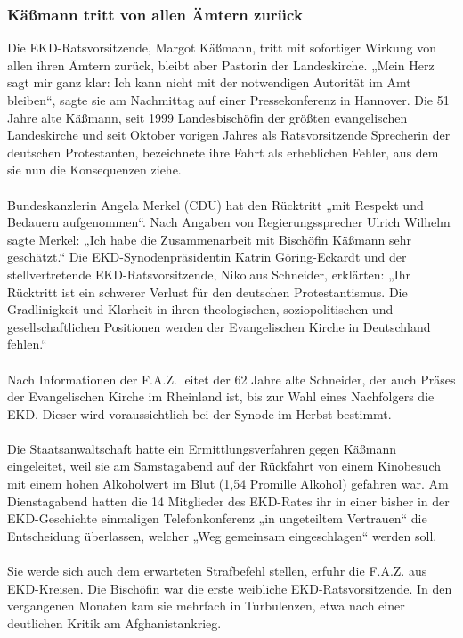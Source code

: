 \documentclass[a4paper,12pt,oneside]{scrbook}
\begin{document}
\subsubsection{Käßmann tritt von allen Ämtern zurück}
Die EKD-Ratsvorsitzende, Margot Käßmann, tritt mit sofortiger Wirkung von allen ihren Ämtern zurück, bleibt aber Pastorin der Landeskirche. „Mein Herz sagt mir ganz klar: Ich kann nicht mit der notwendigen Autorität im Amt bleiben“, sagte sie am Nachmittag auf einer Pressekonferenz in Hannover. Die 51 Jahre alte Käßmann, seit 1999 Landesbischöfin der größten evangelischen Landeskirche und seit Oktober vorigen Jahres als Ratsvorsitzende Sprecherin der deutschen Protestanten, bezeichnete ihre Fahrt als erheblichen Fehler, aus dem sie nun die Konsequenzen ziehe.
\\\\
Bundeskanzlerin Angela Merkel (CDU) hat den Rücktritt „mit Respekt und Bedauern aufgenommen“. Nach Angaben von Regierungssprecher Ulrich Wilhelm sagte Merkel: „Ich habe die Zusammenarbeit mit Bischöfin Käßmann sehr geschätzt.“ Die EKD-Synodenpräsidentin Katrin Göring-Eckardt und der stellvertretende EKD-Ratsvorsitzende, Nikolaus Schneider, erklärten: „Ihr Rücktritt ist ein schwerer Verlust für den deutschen Protestantismus. Die Gradlinigkeit und Klarheit in ihren theologischen, soziopolitischen und gesellschaftlichen Positionen werden der Evangelischen Kirche in Deutschland fehlen.“
\\\\
Nach Informationen der F.A.Z. leitet der 62 Jahre alte Schneider, der auch Präses der Evangelischen Kirche im Rheinland ist, bis zur Wahl eines Nachfolgers die EKD. Dieser wird voraussichtlich bei der Synode im Herbst bestimmt.
\\\\
Die Staatsanwaltschaft hatte ein Ermittlungsverfahren gegen Käßmann eingeleitet, weil sie am Samstagabend auf der Rückfahrt von einem Kinobesuch mit einem hohen Alkoholwert im Blut (1,54 Promille Alkohol) gefahren war. Am Dienstagabend hatten die 14 Mitglieder des EKD-Rates ihr in einer bisher in der EKD-Geschichte einmaligen Telefonkonferenz „in ungeteiltem Vertrauen“ die Entscheidung überlassen, welcher „Weg gemeinsam eingeschlagen“ werden soll.
\\\\
Sie werde sich auch dem erwarteten Strafbefehl stellen, erfuhr die F.A.Z. aus EKD-Kreisen. Die Bischöfin war die erste weibliche EKD-Ratsvorsitzende. In den vergangenen Monaten kam sie mehrfach in Turbulenzen, etwa nach einer deutlichen Kritik am Afghanistankrieg.
\end{document}
